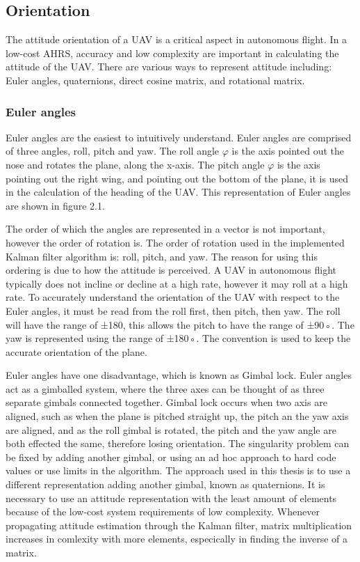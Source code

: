\subsection{Orientation}

The attitude orientation of a UAV is a critical aspect in autonomous flight. In a low-cost
AHRS, accuracy and low complexity are important in calculating the attitude of the UAV.
There are various ways to represent attitude including: Euler angles, quaternions, direct
cosine matrix, and rotational matrix.

\subsubsection{Euler angles}

Euler angles are the easiest to intuitively understand. Euler angles are comprised of three angles, roll, pitch and yaw. The roll angle $\varphi$  is the axis pointed out the nose and rotates the plane, along the x-axis. The pitch angle $\varphi$ is the axis pointing out the right wing, and
pointing out the bottom of the plane, it is used in the calculation of the heading of the UAV.
This representation of Euler angles are shown in figure 2.1.

The order of which the angles are represented in a vector is not important, however the
order of rotation is. The order of rotation used in the implemented Kalman filter algorithm is: roll, pitch, and yaw. The reason for using this ordering is due to how the attitude is perceived. A UAV in autonomous flight typically does not incline or decline at a high rate, however it may roll at a high rate. To accurately understand the orientation of the UAV with respect to the Euler angles, it must be read from the roll first, then pitch, then yaw.
The roll will have the range of ±180, this allows the pitch to have the range of ±90◦. The
yaw is represented using the range of ±180◦. The convention is used to keep the accurate
orientation of the plane.

Euler angles have one disadvantage, which is known as Gimbal lock. Euler angles act
as a gimballed system, where the three axes can be thought of as three separate gimbals
connected together. Gimbal lock occurs when two axis are aligned, such as when the plane
is pitched straight up, the pitch an the yaw axis are aligned, and as the roll gimbal is rotated, the pitch and the yaw angle are both effected the same, therefore losing orientation. The singularity problem can be fixed by adding another gimbal, or using an ad hoc approach to hard code values or use limits in the algorithm. The approach used in this thesis is to use a different representation adding another gimbal, known as quaternions. It is necessary to use an attitude representation with the least amount of elements because of the low-cost system requirements of low complexity. Whenever propagating attitude estimation through the Kalman filter, matrix multiplication increases in comlexity with more elements, especically in finding the inverse of a matrix.

